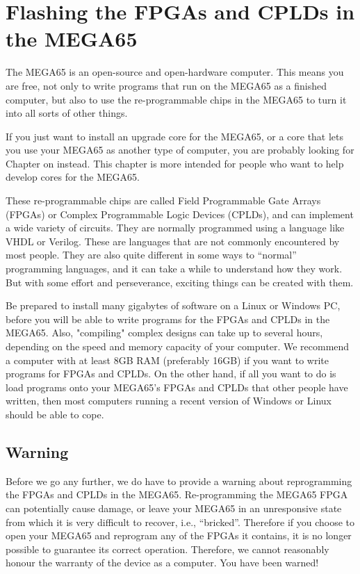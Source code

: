 \chapter{Flashing the FPGAs and CPLDs in the MEGA65}
\label{cha:fpgacpldflashing}

The MEGA65 is an open-source and open-hardware computer. This means you are free,
not only to write programs that run on the MEGA65 as a finished computer, but also to
use the re-programmable chips in the MEGA65 to turn it into all sorts of other things.

If you just want to install an upgrade core for the MEGA65, or a core that lets you use
your MEGA65 as another type of computer, you are probably looking for
Chapter on  instead.
This chapter is more intended for people who want to help develop cores for the MEGA65.

These re-programmable chips are called Field Programmable Gate Arrays (FPGAs) or
Complex Programmable Logic Devices (CPLDs), and can implement a wide variety of circuits.
They are normally programmed using a language like VHDL or Verilog.  These
are languages that are not commonly encountered by most people.  They are also quite
different in some ways to ``normal'' programming languages, and it can take a while to
understand how they work. But with some effort and perseverance, exciting things can be created with them.

Be prepared to install many gigabytes of software on a Linux or Windows PC, before you will
be able to write programs for the FPGAs and CPLDs in the MEGA65.  Also,
"compiling" complex
designs can take up to several hours, depending on the speed and memory
capacity of your computer.
We recommend a computer with at least 8GB RAM (preferably 16GB) if you want to write
programs for FPGAs and CPLDs. On the other hand, if all you want to do is load programs onto
your MEGA65's FPGAs and CPLDs that other people have written, then most
computers running a recent
version of Windows or Linux should be able to cope.

\section{Warning}

Before we go any further, we do have to provide a warning about reprogramming the FPGAs and
CPLDs in the MEGA65.
Re-programming the MEGA65 FPGA can potentially cause
damage, or leave your MEGA65 in an unresponsive state from which it is very difficult to
recover, i.e., ``bricked''.  Therefore if you choose to open your MEGA65 and reprogram
any of the FPGAs it contains, it is no longer possible to guarantee its correct operation.
Therefore, we cannot reasonably honour the warranty of the
device as a computer.
You have been warned!

